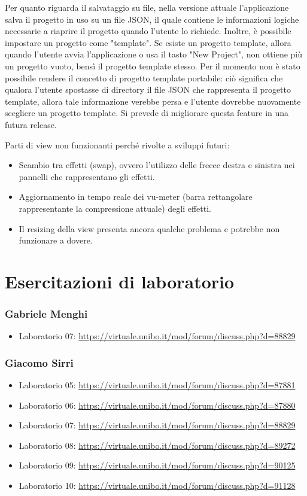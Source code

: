 \documentclass[a4paper,12pt]{report}
\begin{document}
Per quanto riguarda il salvataggio su file, nella versione attuale l'applicazione salva il progetto in uso su un file JSON, il quale contiene le informazioni logiche necessarie a riaprire il progetto quando l'utente lo richiede. Inoltre, è possibile impostare un progetto come "template". Se esiste un progetto template, allora quando l'utente avvia l'applicazione o usa il tasto "New Project", non ottiene più un progetto vuoto, bensì il progetto template stesso. Per il momento non è stato possibile rendere il concetto di progetto template portabile: ciò significa che qualora l'utente spostasse di directory il file JSON che rappresenta il progetto template, allora tale informazione verebbe persa e l'utente dovrebbe nuovamente scegliere un progetto template. Si prevede di migliorare questa feature in una futura release. 

Parti di view non funzionanti perché rivolte a sviluppi futuri:
\begin{itemize}
    \item Scambio tra effetti (swap), ovvero l'utilizzo delle frecce destra e sinistra nei pannelli che rappresentano gli effetti.
    \item Aggiornamento in tempo reale dei vu-meter (barra rettangolare rappresentante la compressione attuale) degli effetti.
    \item Il resizing della view presenta ancora qualche problema e potrebbe non funzionare a dovere. 
\end{itemize}

\chapter{Esercitazioni di laboratorio}

\subsection{Gabriele Menghi}

\begin{itemize}
 \item Laboratorio 07: \url{https://virtuale.unibo.it/mod/forum/discuss.php?d=88829}
\end{itemize}

\subsection{Giacomo Sirri}
\begin{itemize}
 \item Laboratorio 05: \url{https://virtuale.unibo.it/mod/forum/discuss.php?d=87881}
 \item Laboratorio 06:
 \url{https://virtuale.unibo.it/mod/forum/discuss.php?d=87880}
 \item Laboratorio 07:
 \url{https://virtuale.unibo.it/mod/forum/discuss.php?d=88829}
 \item Laboratorio 08:
 \url{https://virtuale.unibo.it/mod/forum/discuss.php?d=89272}
 \item Laboratorio 09:
 \url{https://virtuale.unibo.it/mod/forum/discuss.php?d=90125}
 \item Laboratorio 10:
 \url{https://virtuale.unibo.it/mod/forum/discuss.php?d=91128}
\end{itemize}
\end{document}
